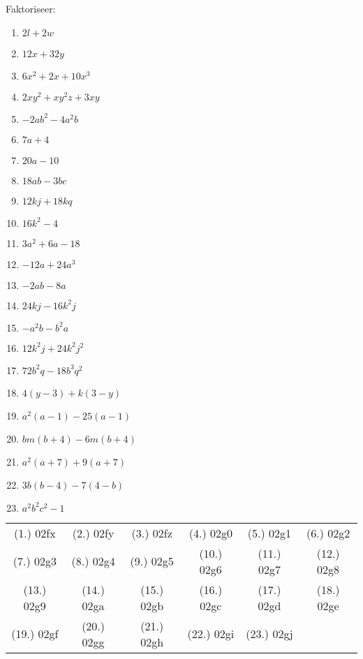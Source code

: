 \begin{exercises}{}
{
Faktoriseer:
\begin{multicols}{2}
\begin{enumerate}[itemsep=5pt, label=\textbf{\arabic*}. ] 
\item $2l+2w$
\item $12x+32y$
\item $6{x}^{2}+2x+10{x}^{3}$
\item $2x{y}^{2}+x{y}^{2}z+3xy$
\item $-2a{b}^{2}-4{a}^{2}b$
\item $7a+4$ 
\item $20a-10$ 
\item $18ab-3bc$
\item $12kj+18kq$ 
\item $16{k}^{2}-4$ 
\item $3{a}^{2}+6a-18$
\item $-12a+24a^3$ 
\item $-2ab-8a$ 
\item $24kj-16{k}^{2}j$
\item $-{a}^{2}b-{b}^{2}a$ 
\item $12{k}^{2}j+24{k}^{2}{j}^{2}$ 
\item $72{b}^{2}q-18{b}^{3}{q}^{2}$
\item $4(y-3)+k(3-y)$ 
\item $a^2(a-1)-25(a-1)$ 
\item $bm(b+4)-6m(b+4)$
\item ${a}^{2}(a+7)+9(a+7)$ 
\item $3b(b-4)-7(4-b)$ 
\item ${a}^{2}{b}^{2}{c}^{2}-1$
\end{enumerate}
\end{multicols}

\par \practiceinfo
\par \begin{tabular}[h]{cccccc}
(1.)	02fx	&
(2.)	02fy	&
(3.)	02fz	&
(4.)	02g0	&
(5.)	02g1	&
(6.)	02g2	\\ %
(7.)	02g3	&
(8.)	02g4	&
(9.)	02g5	&
(10.)	02g6	&
(11.)	02g7	&
(12.)	02g8	\\ %
(13.)	02g9	&
(14.)	02ga	&
(15.)	02gb	&
(16.)	02gc	&
(17.)	02gd	&
(18.)	02ge	\\ %
(19.)	02gf	&
(20.)	02gg	&
(21.)	02gh	&
(22.)	02gi	&
(23.)	02gj	&
\end{tabular}
}
\end{exercises}

